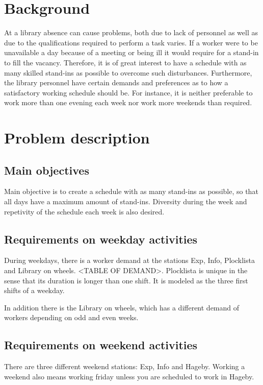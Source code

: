 

\section{Background}
At a library absence can cause problems, both due to lack of personnel as well as due to the qualifications required to perform a task varies. If a worker were to be unavailable a day because of a meeting or being ill it would require for a stand-in to fill the vacancy. Therefore, it is of great interest to have a schedule with as many skilled stand-ins as possible to overcome such disturbances. Furthermore, the library personnel have certain demands and preferences as to how a satisfactory working schedule should be. For instance, it is neither preferable to work more than one evening each week nor work more weekends than required. 

\section{Problem description}
\subsection{Main objectives}
Main objective is to create a schedule with as many stand-ins as possible, so that all days have a maximum amount of stand-ins. Diversity during the week and repetivity of the schedule each week is also desired.

\subsection{Requirements on weekday activities}
During weekdays, there is a worker demand at the stations Exp, Info, Plocklista and Library on wheels. <TABLE OF DEMAND>. Plocklista is unique in the sense that its duration is longer than one shift. It is modeled as the three first shifts of a weekday.

In addition there is the Library on wheels, which has a different demand of workers depending on odd and even weeks. 
\subsection{Requirements on weekend activities}
There are three different weekend stations: Exp, Info and Hageby. Working a weekend also means working friday unless you are scheduled to work in Hageby. 
